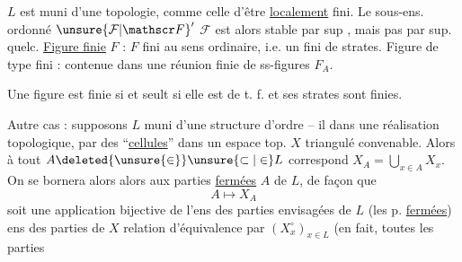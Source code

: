 $L$ est muni d'une topologie, comme celle d'être \uline{localement} fini. Le sous-ens.
ordonné ${\unsure{\mathcal F|\mathscr F}}'$  $\mathcal F$ est alors stable par sup , mais pas   par sup.
quelc. \uline{Figure finie} $F$ :  $F$ fini au sens ordinaire, i.e. un  fini de strates. Figure de type fini : contenue
dans une réunion finie de ss-figures $F_A$.

 Une figure est  finie  si et seult si elle est de t. f. et ses strates sont finies.

Autre cas : supposons $L$ muni d'une structure d'ordre -- il  dans une réalisation topologique, par des ``\uline{cellules}''  dans un espace
top. $X$ triangulé convenable. Alors à tout $A\deleted{\unsure{\in}}\unsure{\subset|\in}L$ correspond  $X_A=\bigcup_{x\in A}X_x$.
On se bornera alors alors aux parties \uline{fermées} $A$ de $L$, de façon que
\[ A\longmapsto X_A \]
soit une application bijective de l'ens des parties envisagées de $L$ (les p. \uline{fermées})
 ens des parties  de $X$    relation d'équivalence  par  $(X_x^\circ)_{x\in L}$ (en fait, toutes les parties
